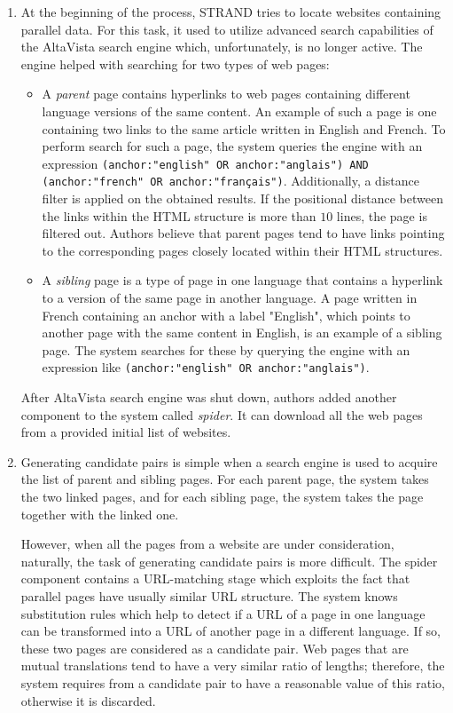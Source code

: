\begin{enumerate}
	\item At the beginning of the process, STRAND tries to locate websites containing parallel data. For this task, it used to utilize advanced search capabilities of the AltaVista search engine which, unfortunately, is no longer active. The engine helped with searching for two types of web pages:

	\begin{itemize}
		\item A \textit{parent} page contains hyperlinks to web pages containing different language versions of the same content. An example of such a page is one containing two links to the same article written in English and French. To perform search for such a page, the system queries the engine with an expression \texttt{(anchor:"english" OR anchor:"anglais") AND (anchor:"french" OR anchor:"français")}. Additionally, a distance filter is applied on the obtained results. If the positional distance between the links within the HTML structure is more than $10$ lines, the page is filtered out. Authors believe that parent pages tend to have links pointing to the corresponding pages closely located within their HTML structures.
		
		\item A \textit{sibling} page is a type of page in one language that contains a hyperlink to a version of the same page in another language. A page written in French containing an anchor with a label "English", which points to another page with the same content in English, is an example of a sibling page. The system searches for these by querying the engine with an expression like \texttt{(anchor:"english" OR anchor:"anglais")}.
	\end{itemize}
	
	After AltaVista search engine was shut down, authors added another component to the system called \textit{spider}. It can download all the web pages from a provided initial list of websites.
	
	\item Generating candidate pairs is simple when a search engine is used to acquire the list of parent and sibling pages. For each parent page, the system takes the two linked pages, and for each sibling page, the system takes the page together with the linked one. 
	
	However, when all the pages from a website are under consideration, naturally, the task of generating candidate pairs is more difficult. The spider component contains a URL-matching stage which exploits the fact that parallel pages have usually similar URL structure. The system knows substitution rules which help to detect if a URL of a page in one language can be transformed into a URL of another page in a different language. If so, these two pages are considered as a candidate pair. Web pages that are mutual translations tend to have a very similar ratio of lengths; therefore, the system requires from a candidate pair to have a reasonable value of this ratio, otherwise it is discarded.
	

\end{enumerate}
